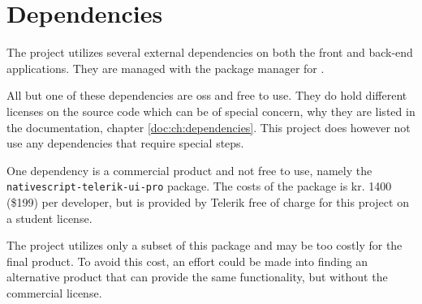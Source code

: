 \chapter{Dependencies}
\label{ch:dependencies}
The project utilizes several external dependencies on both the front and back-end applications.
They are managed with the package manager  for .

All but one of these dependencies are \gls{oss} and free to use.
They do hold different licenses on the source code which can be of special concern, why they are listed in the documentation, chapter \ref{doc:ch:dependencies}. 
This project does however not use any dependencies that require special steps.

One dependency is a commercial product and not free to use, namely the \verb+nativescript-telerik-ui-pro+ package.
The costs of the package is kr. 1400 (\$199) \citep{dependencies:nativescript} per developer, but is provided by Telerik free of charge for this project on a student license.

The project utilizes only a subset of this package and may be too costly for the final product.
To avoid this cost, an effort could be made into finding an alternative product that can provide the same functionality, but without the commercial license.
